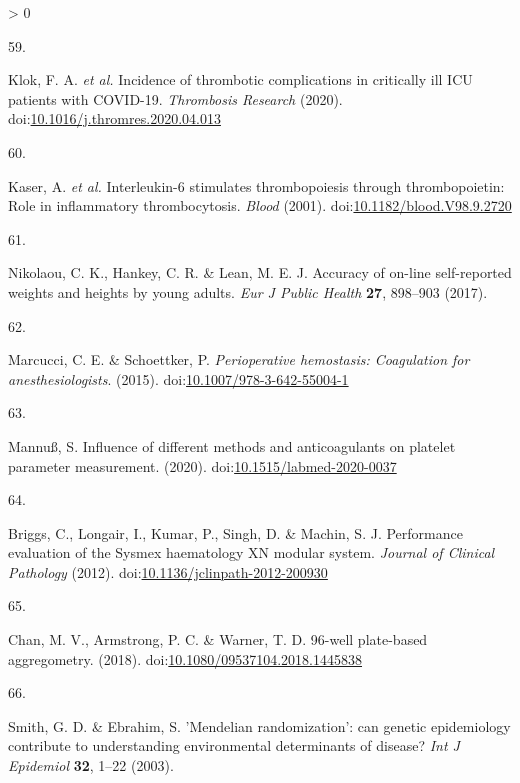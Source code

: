 \documentclass[11pt,twoside]{bristolthesis}
\newlength{\cslhangindent}
\newlength{\csllabelwidth}
\newenvironment{CSLReferences}[2] %
 {%
  \setlength{\parindent}{0pt}
  \ifodd #1 \everypar{\setlength{\hangindent}{\cslhangindent}}\ignorespaces\fi
  \ifnum #2 > 0
  \setlength{\parskip}{#2\baselineskip}
  \fi
 }%
 {}
\newcommand{\CSLLeftMargin}[1]{\parbox[t]{\csllabelwidth}{#1}}
\newcommand{\CSLRightInline}[1]{\parbox[t]{\linewidth - \csllabelwidth}{#1}\break}
\begin{document}
\begin{CSLReferences}{0}{0}
\leavevmode\hypertarget{ref-Klok2020}{}%
\CSLLeftMargin{59. }
\CSLRightInline{Klok, F. A. \emph{et al.} {Incidence of thrombotic complications in critically ill ICU patients with COVID-19}. \emph{Thrombosis Research} (2020). doi:\href{https://doi.org/10.1016/j.thromres.2020.04.013}{10.1016/j.thromres.2020.04.013}}

\leavevmode\hypertarget{ref-Kaser2001}{}%
\CSLLeftMargin{60. }
\CSLRightInline{Kaser, A. \emph{et al.} {Interleukin-6 stimulates thrombopoiesis through thrombopoietin: Role in inflammatory thrombocytosis}. \emph{Blood} (2001). doi:\href{https://doi.org/10.1182/blood.V98.9.2720}{10.1182/blood.V98.9.2720}}

\leavevmode\hypertarget{ref-Nikolaou2017}{}%
\CSLLeftMargin{61. }
\CSLRightInline{Nikolaou, C. K., Hankey, C. R. \& Lean, M. E. J. {Accuracy of on-line self-reported weights and heights by young adults}. \emph{Eur J Public Health} \textbf{27}, 898--903 (2017).}

\leavevmode\hypertarget{ref-Marcucci2015}{}%
\CSLLeftMargin{62. }
\CSLRightInline{Marcucci, C. E. \& Schoettker, P. \emph{{Perioperative hemostasis: Coagulation for anesthesiologists}}. (2015). doi:\href{https://doi.org/10.1007/978-3-642-55004-1}{10.1007/978-3-642-55004-1}}

\leavevmode\hypertarget{ref-Mannuuxdf2020}{}%
\CSLLeftMargin{63. }
\CSLRightInline{Mannuß, S. {Influence of different methods and anticoagulants on platelet parameter measurement}. (2020). doi:\href{https://doi.org/10.1515/labmed-2020-0037}{10.1515/labmed-2020-0037}}

\leavevmode\hypertarget{ref-Briggs2012}{}%
\CSLLeftMargin{64. }
\CSLRightInline{Briggs, C., Longair, I., Kumar, P., Singh, D. \& Machin, S. J. {Performance evaluation of the Sysmex haematology XN modular system}. \emph{Journal of Clinical Pathology} (2012). doi:\href{https://doi.org/10.1136/jclinpath-2012-200930}{10.1136/jclinpath-2012-200930}}

\leavevmode\hypertarget{ref-Chan2018}{}%
\CSLLeftMargin{65. }
\CSLRightInline{Chan, M. V., Armstrong, P. C. \& Warner, T. D. 96-well plate-based aggregometry. (2018). doi:\href{https://doi.org/10.1080/09537104.2018.1445838}{10.1080/09537104.2018.1445838}}

\leavevmode\hypertarget{ref-Smith2003}{}%
\CSLLeftMargin{66. }
\CSLRightInline{Smith, G. D. \& Ebrahim, S. {'Mendelian randomization': can genetic epidemiology contribute to understanding environmental determinants of disease?} \emph{Int J Epidemiol} \textbf{32}, 1--22 (2003).}


\end{CSLReferences}
\end{document}

